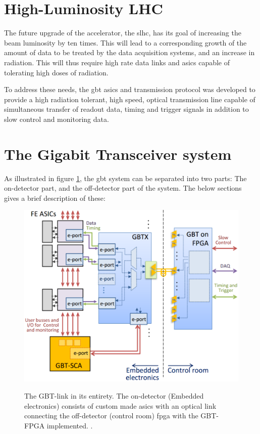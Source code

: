\documentclass[main.tex]{subfiles}
\begin{document}
\section{High-Luminosity LHC}

The future upgrade of the  accelerator, the \gls{slhc}, has its goal of increasing the beam luminosity by ten times. This will lead to a corresponding growth of the amount of data to be treated by the data acquisition systems, and an increase in radiation. This will thus require high rate data links and \glspl{asic} capable of tolerating high doses of radiation.

To address these needs, the \gls{gbt} \glspl{asic} and transmission protocol was developed to provide a high radiation tolerant, high speed, optical transmission line capable of simultaneous transfer of readout data, timing and trigger signals in addition to slow control and monitoring data.

\section{The Gigabit Transceiver system}
As illustrated in figure \ref{fig:gbtsys}, the \gls{gbt} system can be separated into two parts: The on-detector part, and the off-detector part of the system. The below sections gives a brief description of these:

\begin{figure}[!b] %
\includegraphics[width=0.7\linewidth]{../img/gbtsys}  \\[0.1 cm]
\caption{The GBT-link in its entirety. The on-detector (Embedded electronics) consists of custom made \glspl{asic} with an optical link connecting the off-detector (control room) \gls{fpga} with the GBT-FPGA implemented. \cite[Figure 1]{gbtscapres14}.}
\label{fig:gbtsys}
\end{figure}
\end{document}
